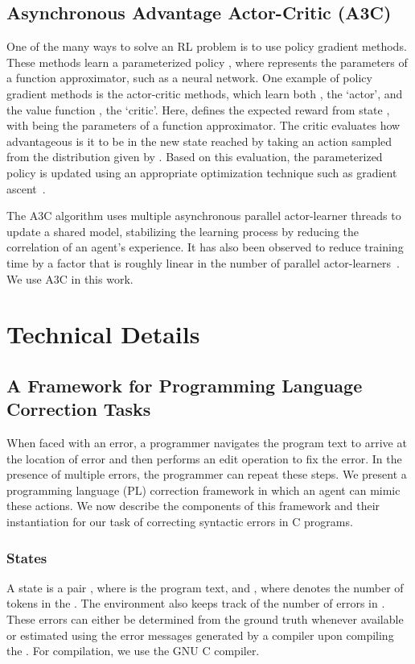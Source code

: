 \documentclass{article}
\begin{document}
\subsection{Asynchronous Advantage Actor-Critic (A3C)}
One of the many ways to solve an RL problem is to use policy gradient methods.
These methods learn a parameterized policy , where  represents the parameters of a function approximator, such as a neural network.
One example of policy gradient methods is the actor-critic methods, which learn both , the `actor', and the value function , the `critic'.
Here,  defines the expected reward from state , with  being the parameters of a function approximator. 
The critic evaluates how advantageous is it to be in the new state reached by taking an action  sampled from the distribution given by .
Based on this evaluation, the parameterized policy is updated using an appropriate optimization technique such as gradient ascent~\cite{sutton1998reinforcement}.

The A3C algorithm uses multiple asynchronous parallel actor-learner threads to update a shared model, stabilizing the learning process by reducing the correlation of an agent's experience.
It has also been observed to reduce training time by a factor that is roughly linear in the number of parallel actor-learners~\cite{mnih2016asynchronous}.
We use A3C in this work.
 \section{Technical Details}

\subsection{A Framework for Programming Language Correction Tasks}
When faced with an error,
a programmer navigates the program text to arrive at the location of error and then performs an edit operation to fix the error.
In the presence of multiple errors, the programmer can repeat these steps.
We present a programming language (PL) correction framework in which an agent can mimic these actions.
We now describe the components of this framework and their instantiation for our task of
correcting syntactic errors in C programs.

\subsubsection{States}
A state is a pair , where  is the program text, and , where  denotes the number of tokens in the .
The environment also keeps track of the number of errors in .
These errors can either be determined from the ground truth whenever available or estimated using the error messages generated by a compiler upon compiling the .
For compilation, we use the GNU C compiler.
	
\end{document}
